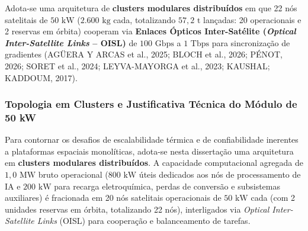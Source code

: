 Adota-se uma arquitetura de \textbf{clusters modulares distribuídos} em que 22 nós satelitais de $50\text{ kW}$ ($2.600\text{ kg}$ cada, totalizando $57{,}2\text{ t}$ lançadas: 20 operacionais e 2 reservas em órbita) cooperam via \textbf{Enlaces Ópticos Inter-Satélite (\textit{Optical Inter-Satellite Links} -- OISL)} de $100\text{ Gbps}$ a $1\text{ Tbps}$ para sincronização de gradientes (AGÜERA Y ARCAS et al., 2025; BLOCH et al., 2026; PÉNOT, 2026; SORET et al., 2024; LEYVA-MAYORGA et al., 2023; KAUSHAL; KADDOUM, 2017).

\subsubsection{Topologia em Clusters e Justificativa Técnica do Módulo de 50 kW}
\label{sec:tradeoff_custo_escala}

Para contornar os desafios de escalabilidade térmica e de confiabilidade inerentes a plataformas espaciais monolíticas, adota-se nesta dissertação uma arquitetura em \textbf{clusters modulares distribuídos}. A capacidade computacional agregada de $1{,}0\text{ MW}$ bruto operacional ($800\text{ kW}$ úteis dedicados aos nós de processamento de IA e $200\text{ kW}$ para recarga eletroquímica, perdas de conversão e subsistemas auxiliares) é fracionada em 20 nós satelitais operacionais de $50\text{ kW}$ cada (com 2 unidades reservas em órbita, totalizando 22 nós), interligados via \textit{Optical Inter-Satellite Links} (OISL) para cooperação e balanceamento de tarefas.

